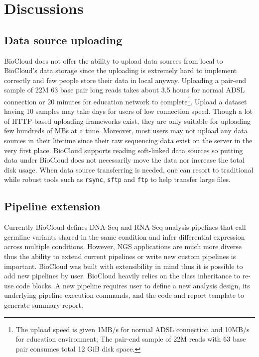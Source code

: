 \chapter{Discussions}
\label{c:discussion}


\section{Data source uploading}

BioCloud does not offer the ability to upload data sources from local to
BioCloud's data storage since the uploading is extremely hard to implement
correctly and few people store their data in local anyway. Uploading a pair-end
sample of 22M 63 base pair long reads takes about 3.5 hours for normal ADSL
connection or 20 minutes for education network to complete\footnote{
    The upload speed is given 1MB/s for normal ADSL connection and 10MB/s for
    education environment; The pair-end sample of 22M reads with 63 base pair
    consumes total 12 GiB disk space.
}. Upload a dataset having 10 samples may take days for users of low connection
speed. Though a lot of HTTP-based uploading frameworks exist, they are only
suitable for uploading few hundreds of MBs at a time. Moreover, most users may
not upload any data sources in their lifetime since their raw sequencing data
exist on the server in the very first place. BioCloud supports reading
soft-linked data sources so putting data under BioCloud does not necessarily
move the data nor increase the total disk usage. When data source transferring
is needed, one can resort to traditional while robust tools  such as
\texttt{rsync}, \texttt{sftp} and \texttt{ftp} to help transfer large files.



\section{Pipeline extension}
\label{s:pipeline-extension}

Currently BioCloud defines DNA-Seq and RNA-Seq analysis pipelines that call
germline variants shared in the same condition and infer differential
expression across multiple conditions. However, NGS applications are much more
diverse thus the ability to extend current pipelines or write new custom
pipelines is important. BioCloud was built with extensibility in mind thus it
is possible to add new pipelines by user. BioCloud heavily relies on the class
inheritance to re-use code blocks. A new pipeline requires user to define a new
analysis design, its underlying pipeline execution commands, and the code and
report template to generate summary report.

